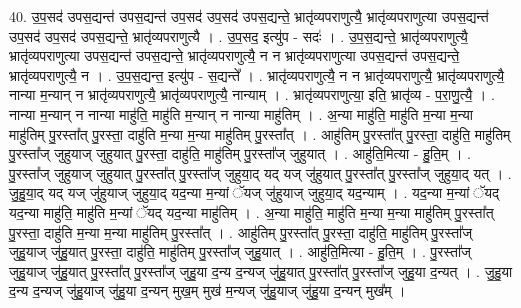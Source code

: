 \documentclass[17pt]{extarticle}
\begin{document}
40. उ॒प॒सद॑ उपस॒द्यन्त॑ उपस॒द्यन्त॑ उप॒सद॑ उप॒सद॑ उपस॒द्यन्ते॒ भ्रातृ॑व्यपराणुत्यै॒ भ्रातृ॑व्यपराणुत्या उपस॒द्यन्त॑ उप॒सद॑ उप॒सद॑ उपस॒द्यन्ते॒ भ्रातृ॑व्यपराणुत्यै । . उ॒प॒सद॒ इत्यु॑प - सदः॑ । . उ॒प॒स॒द्यन्ते॒ भ्रातृ॑व्यपराणुत्यै॒ भ्रातृ॑व्यपराणुत्या उपस॒द्यन्त॑ उपस॒द्यन्ते॒ भ्रातृ॑व्यपराणुत्यै॒ न न भ्रातृ॑व्यपराणुत्या उपस॒द्यन्त॑ उपस॒द्यन्ते॒ भ्रातृ॑व्यपराणुत्यै॒ न । . उ॒प॒स॒द्यन्त॒ इत्यु॑प - स॒द्यन्ते᳚ । . भ्रातृ॑व्यपराणुत्यै॒ न न भ्रातृ॑व्यपराणुत्यै॒ भ्रातृ॑व्यपराणुत्यै॒ नान्या म॒न्यान् न भ्रातृ॑व्यपराणुत्यै॒ भ्रातृ॑व्यपराणुत्यै॒ नान्याम् । . भ्रातृ॑व्यपराणुत्या॒ इति॒ भ्रातृ॑व्य - प॒रा॒णु॒त्यै॒ । . नान्या म॒न्यान् न नान्या माहु॑ति॒ माहु॑ति म॒न्यान् न नान्या माहु॑तिम् । . अ॒न्या माहु॑ति॒ माहु॑ति म॒न्या म॒न्या माहु॑तिम् पु॒रस्ता᳚त् पु॒रस्ता॒ दाहु॑ति म॒न्या म॒न्या माहु॑तिम् पु॒रस्ता᳚त् । . आहु॑तिम् पु॒रस्ता᳚त् पु॒रस्ता॒ दाहु॑ति॒ माहु॑तिम् पु॒रस्ता᳚ज् जुहुयाज् जुहुयात् पु॒रस्ता॒ दाहु॑ति॒ माहु॑तिम् पु॒रस्ता᳚ज् जुहुयात् । . आहु॑ति॒मित्या - हु॒ति॒म् । . पु॒रस्ता᳚ज् जुहुयाज् जुहुयात् पु॒रस्ता᳚त् पु॒रस्ता᳚ज् जुहुया॒द् यद् यज् जु॑हुयात् पु॒रस्ता᳚त् पु॒रस्ता᳚ज् जुहुया॒द् यत् । . जु॒हु॒या॒द् यद् यज् जु॑हुयाज् जुहुया॒द् यद॒न्या म॒न्यां ॅयज् जु॑हुयाज् जुहुया॒द् यद॒न्याम् । . यद॒न्या म॒न्यां ॅयद् यद॒न्या माहु॑ति॒ माहु॑ति म॒न्यां ॅयद् यद॒न्या माहु॑तिम् । . अ॒न्या माहु॑ति॒ माहु॑ति म॒न्या म॒न्या माहु॑तिम् पु॒रस्ता᳚त् पु॒रस्ता॒ दाहु॑ति म॒न्या म॒न्या माहु॑तिम् पु॒रस्ता᳚त् । . आहु॑तिम् पु॒रस्ता᳚त् पु॒रस्ता॒ दाहु॑ति॒ माहु॑तिम् पु॒रस्ता᳚ज् जुहु॒याज् जु॑हु॒यात् पु॒रस्ता॒ दाहु॑ति॒ माहु॑तिम् पु॒रस्ता᳚ज् जुहु॒यात् । . आहु॑ति॒मित्या - हु॒ति॒म् । . पु॒रस्ता᳚ज् जुहु॒याज् जु॑हु॒यात् पु॒रस्ता᳚त् पु॒रस्ता᳚ज् जुहु॒या द॒न्य द॒न्यज् जु॑हु॒यात् पु॒रस्ता᳚त् पु॒रस्ता᳚ज् जुहु॒या द॒न्यत् । . जु॒हु॒या द॒न्य द॒न्यज् जु॑हु॒याज् जु॑हु॒या द॒न्यन् मुख॒म् मुख॑ म॒न्यज् जु॑हु॒याज् जु॑हु॒या द॒न्यन् मुख᳚म् । \newline
\pagebreak
{}
\end{document}
